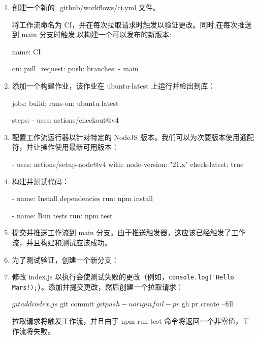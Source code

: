 \begin{enumerate}
\item 
创建一个新的\_github/workflows/ci.yml 文件。

将工作流命名为 CI，并在每次拉取请求时触发以验证更改。同时,在每次推送到 main 分支时触发,以构建一个可以发布的新版本:

\begin{shell}
name: CI

on:
  pull_request:
  push:
    branches:
      - main
\end{shell}

\item 
添加一个构建作业，该作业在 ubuntu-latest 上运行并检出到库：

\begin{shell}
jobs:
  build:
    runs-on: ubuntu-latest

    steps:
      - uses: actions/checkout@v4
\end{shell}

\item 
配置工作流运行器以针对特定的 NodeJS 版本。我们可以为次要版本使用通配符，并让操作使用最新可用版本：

\begin{shell}
- uses: actions/setup-node@v4
  with:
    node-version: "21.x"
    check-latest: true
\end{shell}

\item 
构建并测试代码：

\begin{shell}
- name: Install dependencies
  run: npm install

- name: Run tests
  run: npm test
\end{shell}

\item 
提交并推送工作流到 main 分支。由于推送触发器，这应该已经触发了工作流，并且构建和测试应该成功。

\item 
为了测试验证，创建一个新分支：


\item 
修改 index.js 以执行会使测试失败的更改（例如，\verb|console.log('Hello Mars!);|）。添加并提交更改，然后创建一个拉取请求：

\begin{shell}
$ git add index.js
$ git commit
$ git push -u origin fail-pr
$ gh pr create --fill
\end{shell}

拉取请求将触发工作流，并且由于 npm run test 命令将返回一个非零值，工作流将失败。

\end{enumerate}

